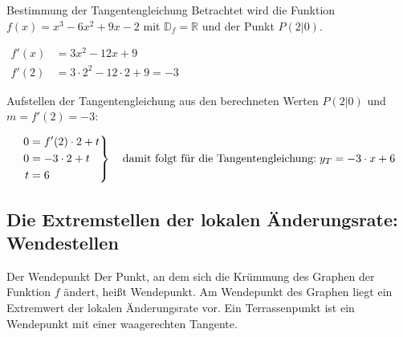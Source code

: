 \label{Tangentengleichung}
\begin{bsp}{Bestimmung der Tangentengleichung}{}
  Betrachtet wird die Funktion $f(x)= x^3 -6x^2 +9x -2$ mit $\mathds{D}_f = \mathds{R}$ und der Punkt $P(2|0)$.
 \begin{center}$\begin{aligned}
	f'(x)&= 3x^2 -12x +9\\
    f'(2) &= 3\cdot 2^2 -12 \cdot 2 +9 = -3
	\end{aligned}$\end{center} 
 Aufstellen der Tangentengleichung aus den berechneten Werten $P(2|0)$ und $m= f'(2) = -3$: 

\begin{equation*}
	\left.\begin{aligned}
	0 &=  f'(2) \cdot 2 + t \\
	0 &= -3 \cdot 2 +t\\
    t &=6
	\end{aligned}
	\right\}
\quad \text{damit folgt für die Tangentengleichung:}\hspace{0.1cm } y_T = -3\cdot x +6 
\end{equation*}
\end{bsp}
\subsection{Die Extremstellen der lokalen Änderungsrate: Wendestellen}  
\begin{defi}{Der Wendepunkt}{}
Der Punkt, an dem sich die Krümmung des Graphen der Funktion $f$ ändert, heißt Wendepunkt. Am Wendepunkt des Graphen liegt ein Extremwert der lokalen Änderungsrate vor. Ein Terrassenpunkt ist ein Wendepunkt mit einer waagerechten Tangente.
\end{defi}

